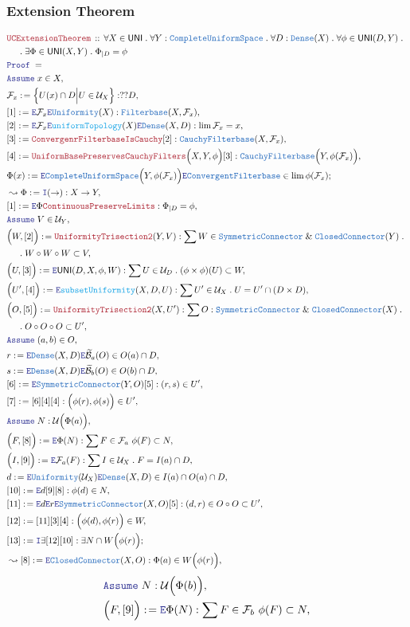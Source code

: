 \documentclass[12pt]{scrartcl}
\newcommand{\TYPE}[1]{\textcolor{NavyBlue}{\mathtt{#1}}}
\newcommand{\FUNC}[1]{\textcolor{Cerulean}{\mathtt{#1}}}
\newcommand{\LOGIC}[1]{\textcolor{Blue}{\mathtt{#1}}}
\newcommand{\THM}[1]{\textcolor{Maroon}{\mathtt{#1}}}
\renewcommand{\.}{\; . \;}
\newcommand{\de}{: \kern 0.1pc =}
\newcommand{\Theorem}[2]{& \THM{#1} \, :: \, #2 \\ & \Proof = \\ }
\newcommand{\NewLine}{\\ & \kern 1pc}
\newcommand{\Page}[1]{ \begin{align*} #1 \end{align*}   }
\renewcommand{\And}{\; \& \;}
\newcommand{\Say}[3]{& #1 \de #2 : #3, \\}
\newcommand{\SayIn}[3]{& #1 \de #2 \in #3, \\}
\newcommand{\Conclude}[3]{& #1 \de #2 : #3; \\}
\newcommand{\ConcludeIn}[3]{& #1 \de #2 \in #3; \\}
\newcommand{\Derive}[3]{& \leadsto #1 \de #2 : #3, \\}
\newcommand{\Assume}[2]{& \LOGIC{Assume} \; #1 : #2, \\}
\newcommand{\AssumeIn}[2]{& \LOGIC{Assume} \; #1 \in #2, \\}
\newcommand{\Intro}{\LOGIC{I}}
\newcommand{\Elim}{\LOGIC{E}}
\newcommand{\Proof}{\LOGIC{Proof} \; }
\newcommand{\B}{\mathcal{B}}
\newcommand{\Filterbase}{\TYPE{Filterbase}}
\newcommand{\CFilterbase}{\TYPE{ConvergentFilterbase}}
\newcommand{\Dense}{\TYPE{Dense}}
\renewcommand{\U}{\mathcal{U}}
\newcommand{\F}{\mathcal{F}}
\newcommand{\UNI}{\mathsf{UNI}}
\newcommand{\CConnector}{\TYPE{ClosedConnector}}
\newcommand{\Unif}{\TYPE{Uniformity}}
\newcommand{\Sym}{\TYPE{SymmetricConnector}}
\newcommand{\CF}{\TYPE{CauchyFilterbase}}
\newcommand{\CUS}{\TYPE{CompleteUniformSpace}}
\begin{document}
\subsubsection{Extension Theorem}
\Page{
	\Theorem{UCExtensionTheorem}
	{
		\forall X \in \UNI \.
		\forall Y : \CUS \. 
		\forall D  : \Dense(X) \.
		\forall \phi \in \UNI(D,Y) \. \NewLine \.
		\exists \Phi \in \UNI(X,Y) \.
		\Phi_{|D} = \phi
	}
	\AssumeIn{x}{X}
	\Say{\F_x}{ \Big\{ U(x) \cap D \Big| U \in \U_X \Big\}  }{??D}
	\Say{[1]}{\Elim \F_x \Elim \Unif(X)}{ \Filterbase(X,\F_x)}
	\Say{[2]}{\Elim \F_x \Elim \FUNC{uniformTopology}(X) \Elim \Dense(X,D)}
	{
		\lim \F_x = x
	}
	\Say{[3]}{\THM{ConvergenrFilterbaseIsCauchy}[2]}
	{
		\CF(X,\F_x)
	}
	\Say{[4]}{\THM{UniformBasePreservesCauchyFilters}\Big( X,Y, \phi\Big)[3]}
	{
		\CF\Big(Y, \phi(\F_x)\Big)
	}
	\ConcludeIn{\Phi(x)}{\Elim \CUS\Big(Y,\phi(\F_x)\Big)\Elim \CFilterbase}
	{
		  \lim \phi(\F_x)
	}
	\Derive{\Phi}{\Intro(\to)}{X \to Y}
	\Say{[1]}{\Elim \Phi \THM{ContinuousPreserveLimits}}
	{
		\Phi_{|D} = \phi
	}
	\AssumeIn{V}{\U_Y}
	\Say{\Big(W,[2]\Big)}{\THM{UniformityTrisection2}(Y,V)}
	{
		\sum W \in \Sym \And \CConnector(Y) \. \NewLine \.
		W \circ W \circ W \subset  V
	}
	\Say{\Big(U,[3]\Big)}
	{
		\Elim \UNI(D,X,\phi,W)	
	}
	{
		\sum U \in \U_D \.  (\phi \times \phi)(U) \subset W
	}
	\Say{\Big(U',[4]\Big)}{\Elim \FUNC{subsetUniformity}(X,D,U)}
	{
		\sum U' \in \U_X \. U = U' \cap (D \times D)
	}
	\Say{\Big(O,[5]\Big)}{\THM{UniformityTrisection2}(X,U')}
	{
		\sum O  : \Sym \And \CConnector(X) \. \NewLine \.
		O \circ O \circ O \subset U'
	}
	\AssumeIn{(a,b)}{O}
	\SayIn{r}{\Elim \Dense(X,D) \Elim \widetilde{\B}_a(O)}{O(a) \cap D}
	\SayIn{s}{\Elim \Dense(X,D) \Elim \widetilde{\B}_b(O)}{O(b) \cap D}
	\Say{[6]}{ \Elim \Sym(Y,O) [5]}
	{
		(r,s) \in U'
	}
	\Say{[7]}{[6][4][4]}{\Big( \phi(r), \phi(s) \Big) \in U'}
	\Assume{N}{\U\Big( \Phi(a) \Big)}
	\Say{\Big(F,[8]\Big)}{\Elim \Phi(N) }
	{
		\sum F \in \F_a \   \phi(F) \subset N 
	}
	\Say{\Big(I,[9]\Big)}{\Elim \F_a(F)}
	{
		\sum I \in \U_X \.  F = I(a) \cap D
	}
	\SayIn{d}{\Elim \Unif (\U_X) \Elim \Dense(X,D) }
	{
		I(a) \cap O(a) \cap D
	}
	\Say{[10]}{\Elim d [9][8]}
	{
		\phi(d) \in N
	}
	\Say{[11]}{\Elim d \Elim r \Elim \Sym(X,O) [5]}{ (d,r) \in O \circ O \subset U' }
	\Say{[12]}{[11][3][4]}{\Big( \phi(d), \phi(r)  \Big) \in W}
	\Conclude{[13]}{\Intro \exists  [12][10]}{\exists N \cap W\Big(\phi(r)\Big)}
	\Derive{[8]}{\Elim \CConnector(X,O)}
	{
		\Phi(a) \in W\Big( \phi(r) \Big)	
	}
}\Page{
	\Assume{N}{\U\Big( \Phi(b) \Big)}
	\Say{\Big(F,[9]\Big)}{\Elim \Phi(N) }
	{
		\sum F \in \F_b \   \phi(F) \subset N 
}}
\end{document}
